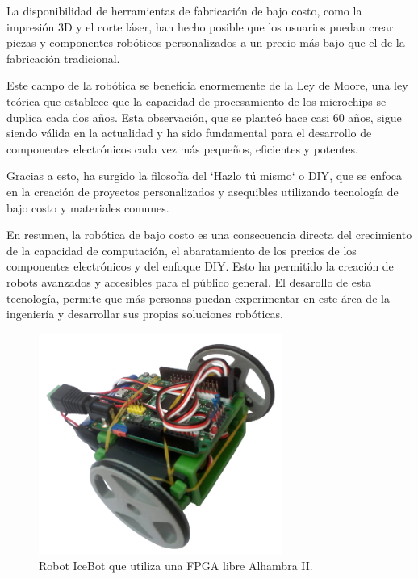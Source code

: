 La disponibilidad de herramientas de fabricación de bajo costo, como la impresión 3D y el corte láser, 
han hecho posible que los usuarios puedan crear piezas y componentes robóticos personalizados a un 
precio más bajo que el de la fabricación tradicional.

Este campo de la robótica se beneficia enormemente de la Ley de Moore, una ley teórica 
que establece que la capacidad de procesamiento de los microchips se duplica cada dos años. Esta observación, que 
se planteó hace casi 60 años, sigue siendo válida en la actualidad y ha sido fundamental para el desarrollo de componentes 
electrónicos cada vez más pequeños, eficientes y potentes.

Gracias a esto, ha surgido la filosofía del `Hazlo tú mismo` o \ac{DIY}, que se enfoca en la creación de proyectos personalizados y 
asequibles utilizando tecnología de bajo costo y materiales comunes.

En resumen, la robótica de bajo costo es una consecuencia directa del crecimiento de la capacidad de computación, 
el abaratamiento de los precios de los componentes electrónicos y del enfoque \ac{DIY}. Esto ha permitido la creación 
de robots avanzados y accesibles para el público general.
El desarollo de esta tecnología, permite que más personas puedan experimentar en este área de la ingeniería y desarrollar 
sus propias soluciones robóticas. 

\begin{figure} [h!]
  \begin{center}
    \includegraphics[width=8cm]{figs/icebot.png}
  \end{center}
  \caption{Robot IceBot que utiliza una FPGA libre Alhambra II.}
  \label{fig:robSecundaria}
\end{figure}\
\newpage
